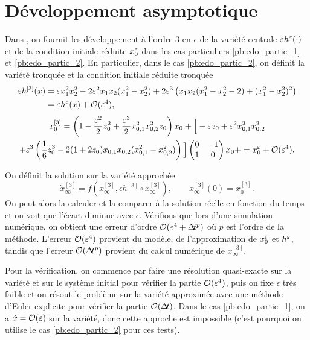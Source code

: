\section{Développement asymptotique}
\label{subsec:ann_asymp}

Dans \cite{castella2016formal}, on fournit les développement à l'ordre 3 en $\epsilon$ de la variété centrale $\varepsilon h^{\varepsilon}(\cdot)$ et de la condition initiale réduite $x_0^{\varepsilon}$ dans les cas particuliers \eqref{pb:edo_partic_1} et \eqref{pb:edo_partic_2}. 
En particulier, dans le cas \eqref{pb:edo_partic_2}, on définit la variété tronquée et la condition initiale réduite tronquée 
\begin{align*}
\varepsilon h^{[3]}(x) ={}& \varepsilon x_1^2 x_2^2 - 2\varepsilon^2 x_1 x_2(x_1^2 - x_2^2) + 2\varepsilon^3 \left(x_1 x_2(x_1^2 - x_2^2 - 2) + (x_1^2 - x_2^2)^2 \right) \\
={}& \varepsilon h^{\varepsilon}(x) + \mathcal{O}(\varepsilon^4), 
\end{align*}
\begin{multline*}
x_0^{[3]} = \left(1- \frac{\varepsilon^2}{2}z_0^2 + \frac{\varepsilon^3}{2} x_{0,1}^2 x_{0,2}^2 z_0 \right) x_0  
+ \Big[-\varepsilon z_0 + \varepsilon^2 x_{0,1}^2 x_{0,2}^2 \\
+ \varepsilon^3 \left( \frac16 z_0^3 - 2(1+2 z_0)x_{0,1}x_{0,2}(x_{0,1}^2 - x_{0,2}^2) \right) \Big]
\begin{pmatrix} 0 & -1 \\ 1 & 0 \end{pmatrix} x_0 + = x_0^{\varepsilon} + \mathcal{O}(\varepsilon^4) .
\end{multline*} 

On définit la solution sur la variété approchée 
$$ \dot{x}^{[3]}_{\infty} = f(x^{[3]}_{\infty},\epsilon h^{[3]}\circ x^{[3]}_{\infty}), \qquad x^{[3]}_{\infty}(0) = x_0^{[3]} . $$
On peut alors la calculer et la comparer à la solution réelle en fonction du temps et on voit que l'écart diminue avec $\epsilon$. 
Vérifions que lors d'une simulation numérique, on obtient une erreur d'ordre $\mathcal{O}(\varepsilon^4 + \Delta\!\!\!\ t^p)$ où $p$ est l'ordre de la méthode. 
L'erreur $\mathcal{O}(\varepsilon^4)$ provient du modèle, de l'approximation de $x_0^{\varepsilon}$ et $h^{\varepsilon}$, tandis que l'erreur $\mathcal{O}(\Delta\!\!\!\ t^p)$ provient du calcul numérique de $x^{[3]}_{\infty}$. 

Pour la vérification, on commence par faire une résolution quasi-exacte sur la variété et sur le système initial pour vérifier la partie $\mathcal{O}(\varepsilon^4)$, 
puis on fixe $\epsilon$ très faible et on résout le problème sur la variété approximée avec une méthode d'Euler explicite pour vérifier la partie $\mathcal{O}(\Delta\!\!\!\ t)$. 
Dans le cas \eqref{pb:edo_partic_1}, on a $\dot{x} = \mathcal{O}(\varepsilon)$ sur la variété, donc cette approche est impossible 
(c'est pourquoi on utilise le cas \eqref{pb:edo_partic_2} pour ces tests). 

